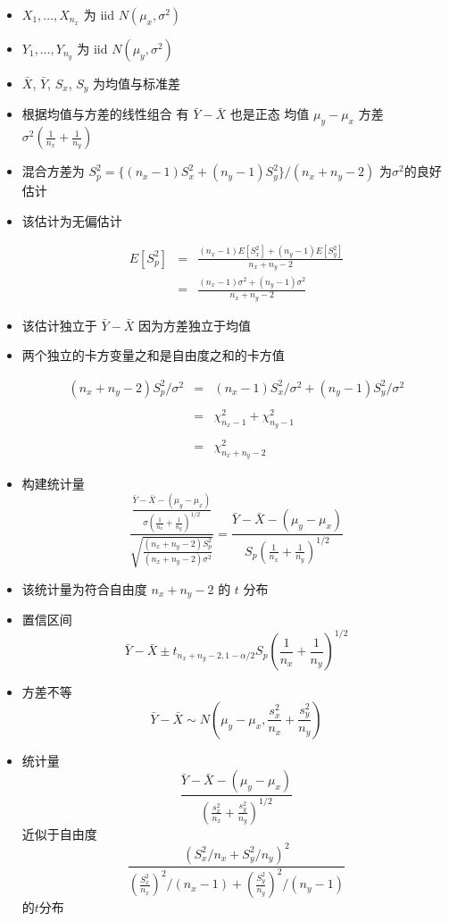 \documentclass[]{book}
\begin{document}
\begin{itemize}
\item
  \(X_1,\ldots,X_{n_x}\) 为 iid \(N(\mu_x,\sigma^2)\)
\item
  \(Y_1,\ldots,Y_{n_y}\) 为 iid \(N(\mu_y, \sigma^2)\)
\item
  \(\bar X\), \(\bar Y\), \(S_x\), \(S_y\) 为均值与标准差
\item
  根据均值与方差的线性组合 有 \(\bar Y - \bar X\) 也是正态 均值 \(\mu_y - \mu_x\) 方差 \(\sigma^2 (\frac{1}{n_x} + \frac{1}{n_y})\)
\item
  混合方差为 \(S_p^2 = \{(n_x - 1) S_x^2 + (n_y - 1) S_y^2\}/(n_x + n_y - 2)\) 为\(\sigma^2\)的良好估计
\item
  该估计为无偏估计

  \begin{eqnarray*}
    E[S_p^2] & = & \frac{(n_x - 1) E[S_x^2] + (n_y - 1) E[S_y^2]}{n_x + n_y - 2}\\
            & = & \frac{(n_x - 1)\sigma^2 + (n_y - 1)\sigma^2}{n_x + n_y - 2}
    \end{eqnarray*}
\item
  该估计独立于 \(\bar Y - \bar X\) 因为方差独立于均值
\item
  两个独立的卡方变量之和是自由度之和的卡方值

  \begin{eqnarray*}
      (n_x + n_y - 2) S_p^2 / \sigma^2 & = & (n_x - 1)S_x^2 /\sigma^2 + (n_y - 1)S_y^2/\sigma^2 \\ \\
      & = & \chi^2_{n_x - 1} + \chi^2_{n_y-1} \\ \\
      & = & \chi^2_{n_x + n_y - 2}
    \end{eqnarray*}
\item
  构建统计量
  \[
    \frac{\frac{\bar Y - \bar X - (\mu_y - \mu_x)}{\sigma \left(\frac{1}{n_x} + \frac{1}{n_y}\right)^{1/2}}}{\sqrt{\frac{(n_x + n_y - 2) S_p^2}{(n_x + n_y - 2)\sigma^2}}}
    = \frac{\bar Y - \bar X - (\mu_y - \mu_x)}{S_p \left(\frac{1}{n_x} + \frac{1}{n_y}\right)^{1/2}}
  \]
\item
  该统计量为符合自由度 \(n_x + n_y - 2\) 的 \(t\) 分布
\item
  置信区间
  \[
    \bar Y - \bar X \pm t_{n_x + n_y - 2, 1 - \alpha/2}S_p\left(\frac{1}{n_x} + \frac{1}{n_y}\right)^{1/2}
  \]
\item
  方差不等
  \[
    \bar Y - \bar X \sim N\left(\mu_y - \mu_x, \frac{s_x^2}{n_x} + \frac{s_y^2}{n_y}\right)
  \]
\item
  统计量
  \[
    \frac{\bar Y - \bar X - (\mu_y - \mu_x)}{\left(\frac{s_x^2}{n_x} + \frac{s_y^2}{n_y}\right)^{1/2}}
  \]
  近似于自由度
  \[
    \frac{\left(S_x^2 / n_x + S_y^2/n_y\right)^2}
    {\left(\frac{S_x^2}{n_x}\right)^2 / (n_x - 1) +
      \left(\frac{S_y^2}{n_y}\right)^2 / (n_y - 1)}
  \]
  的\(t\)分布
\end{itemize}
\end{document}
